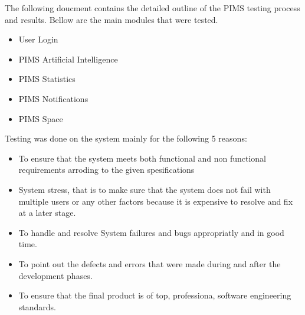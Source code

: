 The following doucment contains the detailed outline of the PIMS testing process and results. Bellow are the main modules that were tested.
\begin{itemize}
	\item User Login
	\item PIMS Artificial Intelligence
	\item PIMS Statistics
	\item PIMS Notifications
	\item PIMS Space
\end{itemize}

Testing was done on the system mainly for the following 5 reasons:

\begin{itemize}
	\item To ensure that the system meets both functional and non functional requirements arroding to the given spesifications
	\item System stress, that is to make sure that the system does not fail with multiple users or any other factors because it is expensive to resolve and fix at a later stage.
	\item To handle and resolve System failures and bugs appropriatly and in good time.
	\item To point out the defects and errors that were made during and after the development phases.
	\item To ensure that the final product is of top, professiona, software engineering standards.
\end{itemize}

